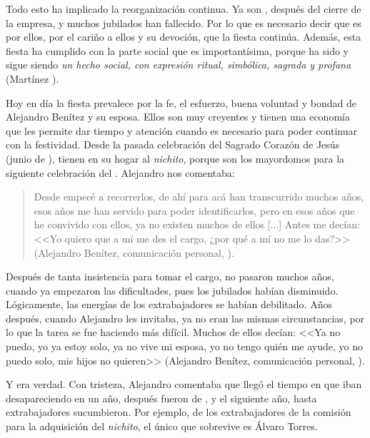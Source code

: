 \documentclass[14pt,letterpaper,twoside]{extbook} %
\begin{document}
Todo esto ha implicado la reorganización continua. Ya son , después del cierre de la empresa, y muchos jubilados han fallecido. Por lo que es necesario decir que es por ellos, por el cariño a ellos y su devoción, que la fiesta continúa. Además, esta fiesta ha cumplido con la parte social que es importantísima, porque ha sido y sigue siendo \textit{un hecho social, con expresión ritual, simbólica, sagrada y profana} (Martínez ).

Hoy en día la fiesta prevalece por la fe, el esfuerzo, buena voluntad y bondad de Alejandro Benítez y su esposa. Ellos son muy creyentes y tienen una economía que les permite dar tiempo y atención cuando es necesario para poder continuar con la festividad. Desde la pasada celebración del Sagrado Corazón de Jesús (junio de ), tienen en su hogar al \textit{nichito}, porque son los mayordomos para la siguiente celebración del . Alejandro nos comentaba:

\begin{quotation}
\noindent Desde  empecé a recorrerlos, de ahí para acá han transcurrido muchos años, esos años me han servido para poder identificarlos, pero en esos años que he convivido con ellos, ya no existen muchos de ellos [...] Antes me decían: <<Yo quiero que a mí me des el cargo, ¿por qué a mí no me lo das?>> (Alejandro Benítez, comunicación personal, ).
\end{quotation}

\noindent Después de tanta insistencia para tomar el cargo, no pasaron muchos años, cuando ya empezaron las dificultades, pues los jubilados habían disminuido. Lógicamente, las energías de los extrabajadores se habían debilitado. Años después, cuando Alejandro les invitaba, ya no eran las mismas circunstancias, por lo que la tarea se fue haciendo más difícil. Muchos de ellos decían: <<Ya no puedo, yo ya estoy solo, ya no vive mi esposa, yo no tengo quién me ayude, yo no puedo solo, mis hijos no quieren>> (Alejandro Benítez, comunicación personal, ).

Y era verdad. Con tristeza, Alejandro comentaba que llegó el tiempo en que iban desapareciendo  en un año, después fueron de , y el siguiente año, hasta  extrabajadores sucumbieron. Por ejemplo, de los extrabajadores de la comisión para la adquisición del \textit{nichito}, el único que sobrevive es Álvaro Torres.
\end{document}
